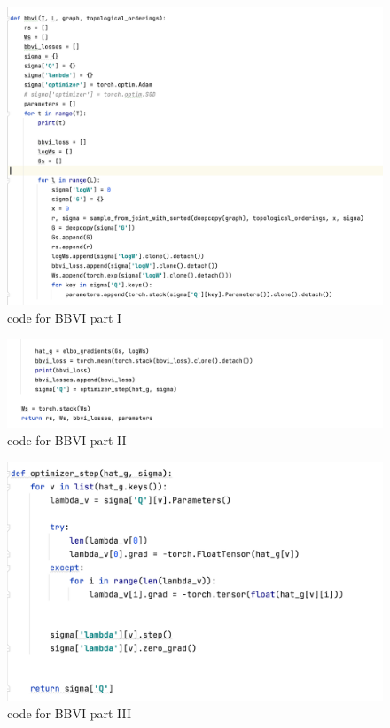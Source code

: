 \documentclass{article}
\begin{document}
\begin{enumerate}
\begin{figure}[!ht]
	\centering
	\includegraphics[scale=0.5]{../figs/bbvi_1}
	\caption{code for BBVI part I}
\end{figure}

\newpage
\begin{figure}[!ht]
	\centering
	\includegraphics[scale=0.5]{../figs/bbvi_2}
	\caption{code for BBVI part II}
\end{figure}

\begin{figure}[!ht]
	\centering
	\includegraphics[scale=0.5]{../figs/bbvi_3}
	\caption{code for BBVI part III}
\end{figure}


\end{enumerate}
\end{document}
